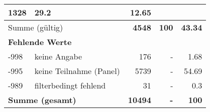 \begin{longtable}{lXrrr}
       \num{1328} &
       \num[round-mode=places,round-precision=2]{29.2} &
         \num[round-mode=places,round-precision=2]{12.65} \\
     \midrule
     \multicolumn{2}{l}{Summe (gültig)} &
       \textbf{\num{4548}} &
     \textbf{\num{100}} &
       \textbf{\num[round-mode=places,round-precision=2]{43.34}} \\
     \multicolumn{5}{l}{\textbf{Fehlende Werte}}\\
       -998 &
       keine Angabe &
         \num{176} &
        - &
         \num[round-mode=places,round-precision=2]{1.68} \\
       -995 &
       keine Teilnahme (Panel) &
         \num{5739} &
        - &
         \num[round-mode=places,round-precision=2]{54.69} \\
       -989 &
       filterbedingt fehlend &
         \num{31} &
        - &
         \num[round-mode=places,round-precision=2]{0.3} \\
     \midrule
     \multicolumn{2}{l}{\textbf{Summe (gesamt)}} &
          \textbf{\num{10494}} &
        \textbf{-} &
        \textbf{\num{100}} \\
     \bottomrule
     \end{longtable}
     
